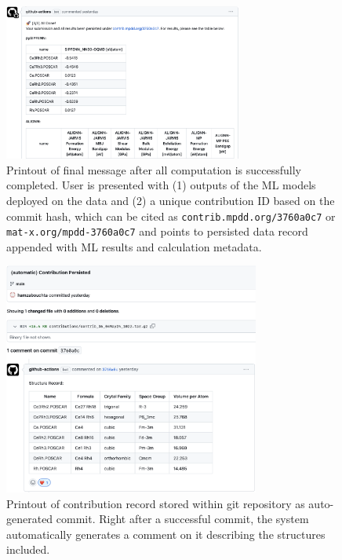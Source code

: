 \begin{figure}[H]
    \centering
    \includegraphics[width=0.7\textwidth]{mpdd/mpddx3.png}
    \caption{Printout of final message after all computation is successfully completed. User is presented with (1) outputs of the ML models deployed on the data and (2) a unique contribution ID based on the commit hash, which can be cited as \texttt{contrib.mpdd.org/3760a0c7} or \texttt{mat-x.org/mpdd-3760a0c7} and points to persisted data record appended with ML results and calculation metadata.}
    \label{mpdd:fig:mpddx3}
\end{figure}


\todo

\begin{figure}[H]
    \centering
    \includegraphics[width=0.75\textwidth]{mpdd/mpddx4.png}
    \caption{Printout of contribution record stored within git repository as auto-generated commit. Right after a successful commit, the system automatically generates a comment on it describing the structures included.}
    \label{mpdd:fig:mpddx4}
\end{figure}




